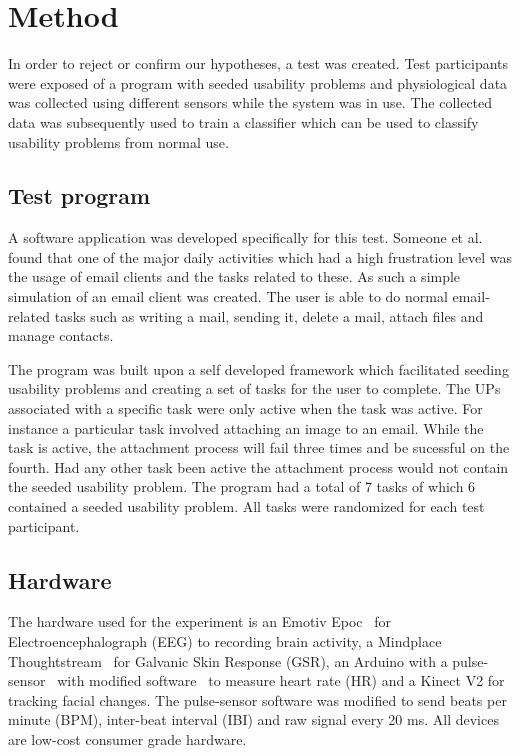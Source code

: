 
\section{Method}
In order to reject or confirm our hypotheses, a test was created.
Test participants were exposed of a program with seeded usability problems and physiological data was collected using different sensors while the system was in use. 
The collected data was subsequently used to train a classifier which can be used to classify usability problems from normal use.

\subsection{Test program}
A software application was developed specifically for this test. 
Someone et al. found that one of the major daily activities which had a high frustration level was the usage of email clients and the tasks related to these. 
As such a simple simulation of an email client was created. 
The user is able to do normal email-related tasks such as writing a mail, sending it, delete a mail, attach files and manage contacts. 

The program was built upon a self developed framework which facilitated seeding usability problems and creating a set of tasks for the user to complete. 
The UPs associated with a specific task were only active when the task was active. 
For instance a particular task involved attaching an image to an email. 
While the task is active, the attachment process will fail three times and be sucessful on the fourth. 
Had any other task been active the attachment process would not contain the seeded usability problem.
The program had a total of 7 tasks of which 6 contained a seeded usability problem. 
All tasks were randomized for each test participant.

\subsection{Hardware}
The hardware used for the experiment is an Emotiv Epoc~\cite{emotiv_epoc_website} for Electroencephalograph (EEG) to recording brain activity, a Mindplace Thoughtstream~\cite{thoughtstream} for Galvanic Skin Response (GSR), an Arduino with a pulse-sensor~\cite{pulsesensor} with modified software~\cite{pulsesensorgit} to measure heart rate (HR) and a Kinect V2\cite{kinect_specs3} for tracking facial changes.
The pulse-sensor software was modified to send beats per minute (BPM), inter-beat interval (IBI) and raw signal every 20 ms.
All devices are low-cost consumer grade hardware.

